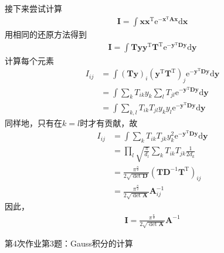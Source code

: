         接下来尝试计算
        \begin{equation}\begin{aligned}
            \bm{I} = \int \bm{xx}^\mathrm{T} \mathrm{e}^{-\bm{x}^\mathrm{T}\bm{Ax}}\mathrm{d}\bm{x}
        \end{aligned}\end{equation}
        用相同的还原方法得到
        \begin{equation}\begin{aligned}
            \bm{I} = \int \bm{Ty}\bm{y}^\mathrm{T}\bm{T}^\mathrm{T} \mathrm{e}^{-\bm{y}^\mathrm{T}\bm{Dy}}\mathrm{d}\bm{y}
        \end{aligned}\end{equation}
        计算每个元素
        \begin{equation}\begin{aligned}
            I_{ij} &= \int (\bm{Ty})_{i}(\bm{y}^\mathrm{T}\bm{T}^\mathrm{T})_{j} \mathrm{e}^{-\bm{y}^\mathrm{T}\bm{Dy}}\mathrm{d}\bm{y}\\
            &= \int \sum_k T_{ik}y_k \sum_l T_{jl} \mathrm{e}^{-\bm{y}^\mathrm{T}\bm{Dy}}\mathrm{d}\bm{y}\\
            &= \int \sum_{k,l} T_{ik}T_{jl} y_ky_l \mathrm{e}^{-\bm{y}^\mathrm{T}\bm{Dy}}\mathrm{d}\bm{y}
        \end{aligned}\end{equation}
        同样地，只有在$k=l$时才有贡献，故
        \begin{equation}\begin{aligned}
            I_{ij} &= \int \sum_k T_{ik}T_{jk}y_k^2 \mathrm{e}^{-\bm{y}^\mathrm{T}\bm{Dy}}\mathrm{d}\bm{y}\\
            &= \prod_l \sqrt{\frac {\pi}{d_l}} \sum_k T_{ik}T_{jk} \frac 1{2d_k}\\
            &= \frac {\pi^{\frac n2}}{2 \sqrt{\det{\bm{D}}}} (\bm{TD}^{-1}\bm{T}^\mathrm{T})_{ij}\\
            &= \frac {\pi^{\frac n2}}{2 \sqrt{\det{\bm{A}}}} \bm{A}^{-1}_{ij}
        \end{aligned}\end{equation}
        因此，
        \begin{equation}\begin{aligned}
            \bm{I} = \frac {\pi^{\frac n2}}{2 \sqrt{\det{\bm{A}}}} \bm{A}^{-1}
        \end{aligned}\end{equation}
        \begin{asg}
            第4次作业第3题：Gauss积分的计算
        \end{asg}
        
        